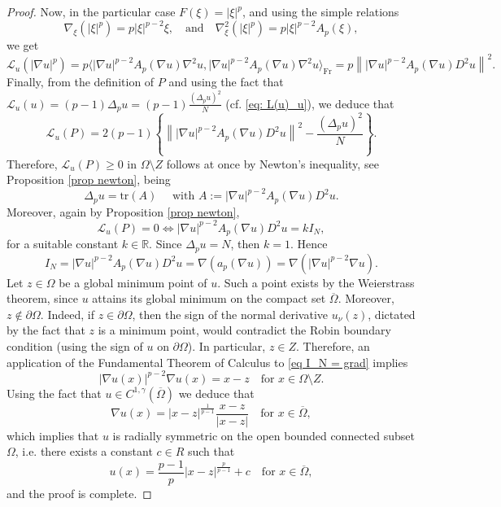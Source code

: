 \documentclass[10pt,a4paper]{amsart}
\numberwithin{equation}{section}
\newcommand{\R}{\mathbb{R}}
\begin{document}
\begin{proof}
    Now, in the particular case $F(\xi)= |\xi|^p$, and using the simple relations
    \begin{equation*}
        \nabla_\xi (|\xi|^p)=p|\xi|^{p-2} \xi,
        \quad\text{and} \quad
        \nabla^2_\xi (|\xi|^p) = p|\xi|^{p-2} A_p(\xi),
    \end{equation*}
    we get
    \begin{equation*}
        \mathcal{L}_u(|\nabla u|^{p}) = p \langle |\nabla u|^{p-2} A_p(\nabla u) \nabla^2 u, |\nabla u|^{p-2} A_p(\nabla u) \nabla^2 u \rangle_{\mathrm{Fr}} = p  \left\||\nabla u|^{p-2}A_p(\nabla u)D^2u \right\|^2.
    \end{equation*}
    Finally, from the definition of $P$ and using the fact that $\mathcal{L}_u(u) = (p-1) \Delta_p u = (p-1) \frac{(\Delta_p u)^2}{N}$ (cf. \eqref{eq: L(u)_u}), we deduce that
    \begin{equation*}
        \mathcal{L}_u(P) = 2(p-1) \left\{ \left\||\nabla u|^{p-2}A_p(\nabla u)D^2u \right\|^2 - \frac{(\Delta_p u)^2}{N} \right\}.
    \end{equation*}
    Therefore, $\mathcal{L}_u(P) \geq 0$ in $\Omega \setminus Z$ follows at once by Newton's inequality, see Proposition \ref{prop newton}, being 
    \[
    \Delta_p u = \mathrm{tr}(A) \quad \text{ with } A:= |\nabla u|^{p-2}A_p(\nabla u)D^2u.
    \]
    Moreover, again by Proposition \ref{prop newton}, 
    \[
    \mathcal{L}_u(P) = 0 \iff |\nabla u|^{p-2}A_p(\nabla u)D^2u = k I_N,
    \]
    for a suitable constant $k \in \R$. Since $\Delta_p u = N$, then $k = 1$. Hence
    \begin{equation}\label{eq I_N = grad}
        I_N = |\nabla u|^{p-2}A_p(\nabla u)D^2u = \nabla ( a_p(\nabla u) ) = \nabla ( |\nabla u|^{p-2} \nabla u). 
    \end{equation}
    Let $z \in \Omega$ be a global minimum point of $u$. Such a point exists by the Weierstrass theorem, since $u$ attains its global minimum on the compact set $\overline{\Omega}$. Moreover, $z \notin \partial\Omega$. Indeed, if $z \in \partial\Omega$, then the sign of the normal derivative $u_\nu(z)$, dictated by the fact that $z$ is a minimum point, would contradict the Robin boundary condition (using the sign of $u$ on $\partial\Omega$). In particular, $z \in Z$. Therefore, an application of the Fundamental Theorem of Calculus to \eqref{eq I_N = grad} implies
    \[
    |\nabla u(x)|^{p-2} \nabla u(x) = x-z \quad \text{for } x \in \Omega \setminus Z.
    \]
    Using the fact that $u \in C^{1,\gamma}(\overline{\Omega})$ we deduce that
    \[
    \nabla u(x) = |x-z|^{\frac{1}{p-1}} \frac{x-z}{|x-z|} \quad \text{for } x \in \overline{\Omega},
    \]
    which implies that $u$ is radially symmetric on the open bounded connected subset $\Omega$, i.e. there exists a constant $c \in R$ such that
    \[
    u(x) = \frac{p-1}{p} |x-z|^{\frac{p}{p-1}} + c \quad \text{for } x \in \overline{\Omega},
    \]
    and the proof is complete.
    \end{proof}
\end{document}
